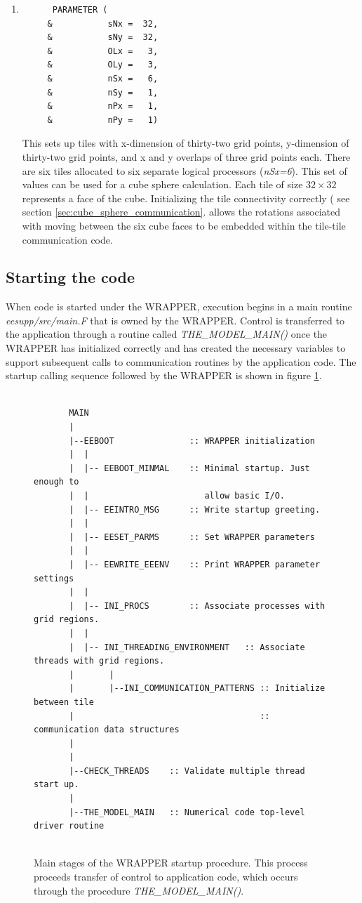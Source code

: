 \begin{enumerate}
\item
\begin{verbatim}
      PARAMETER (
     &           sNx =  32,
     &           sNy =  32,
     &           OLx =   3,
     &           OLy =   3,
     &           nSx =   6,
     &           nSy =   1,
     &           nPx =   1,
     &           nPy =   1)
\end{verbatim}
This sets up tiles with x-dimension of thirty-two grid points, y-dimension of
thirty-two grid points, and x and y overlaps of three grid points each. 
There are six tiles allocated to six separate logical processors ({\em nSx=6}).
This set of values can be used for a cube sphere calculation.
Each tile of size $32 \times 32$ represents a face of the
cube. Initializing the tile connectivity correctly ( see section
\ref{sec:cube_sphere_communication}. allows the rotations associated with
moving between the six cube faces to be embedded within the 
tile-tile communication code.
\end{enumerate}


\subsection{Starting the code}
\label{sec:starting_the_code}
When code is started under the WRAPPER, execution begins in a main routine {\em
eesupp/src/main.F} that is owned by the WRAPPER. Control is transferred 
to the application through a routine called {\em THE\_MODEL\_MAIN()}
once the WRAPPER has initialized correctly and has created the necessary variables
to support subsequent calls to communication routines
by the application code. The startup calling sequence followed by the 
WRAPPER is shown in figure \ref{fig:wrapper_startup}.

\begin{figure}
{\footnotesize
\begin{verbatim}

       MAIN  
       |
       |--EEBOOT               :: WRAPPER initialization
       |  |
       |  |-- EEBOOT_MINMAL    :: Minimal startup. Just enough to
       |  |                       allow basic I/O.
       |  |-- EEINTRO_MSG      :: Write startup greeting.
       |  |
       |  |-- EESET_PARMS      :: Set WRAPPER parameters
       |  |
       |  |-- EEWRITE_EEENV    :: Print WRAPPER parameter settings
       |  |
       |  |-- INI_PROCS        :: Associate processes with grid regions.
       |  |
       |  |-- INI_THREADING_ENVIRONMENT   :: Associate threads with grid regions.
       |       |
       |       |--INI_COMMUNICATION_PATTERNS :: Initialize between tile 
       |                                     :: communication data structures
       |
       |
       |--CHECK_THREADS    :: Validate multiple thread start up.
       |
       |--THE_MODEL_MAIN   :: Numerical code top-level driver routine


\end{verbatim}
}
\caption{Main stages of the WRAPPER startup procedure.
This process proceeds transfer of control to application code, which
occurs through the procedure {\em THE\_MODEL\_MAIN()}.
} \label{fig:wrapper_startup}
\end{figure}

